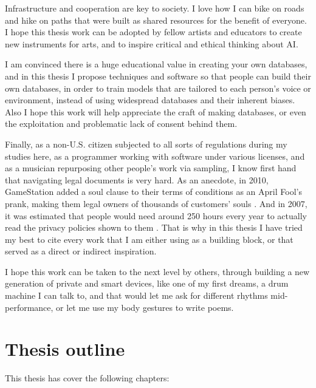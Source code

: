 Infrastructure and cooperation are key to society. I love how I can bike on roads and hike on paths that were built as shared resources for the benefit of everyone. I hope this thesis work can be adopted by fellow artists and educators to create new instruments for arts, and to inspire critical and ethical thinking about \acrshort{AI}.

I am convinced there is a huge educational value in creating your own databases, and in this thesis I propose techniques and software so that people can build their own databases, in order to train models that are tailored to each person's voice or environment, instead of using widespread databases and their inherent biases. Also I hope this work will help appreciate the craft of making databases, or even the exploitation and problematic lack of consent behind them.

Finally, as a non-U.S. citizen subjected to all sorts of regulations during my studies here, as a programmer working with software under various licenses, and as a musician repurposing other people's work via sampling, I know first hand that navigating legal documents is very hard. As an anecdote, in 2010, GameStation added a soul clause to their terms of conditions as an April Fool's prank, making them legal owners of thousands of customers' souls \cite{website-huffpost-gamestation-soul-clause}. And in 2007, it was estimated that people would need around 250 hours every year to actually read the privacy policies shown to them \cite{article-cost-of-reading-privacy-policies}. That is why in this thesis I have tried my best to cite every work that I am either using as a building block, or that served as a direct or indirect inspiration.

I hope this work can be taken to the next level by others, through building a new generation of private and smart devices, like one of my first dreams, a drum machine I can talk to, and that would let me ask for different rhythms mid-performance, or let me use my body gestures to write poems.

\section{Thesis outline}

This thesis has cover the following chapters:

